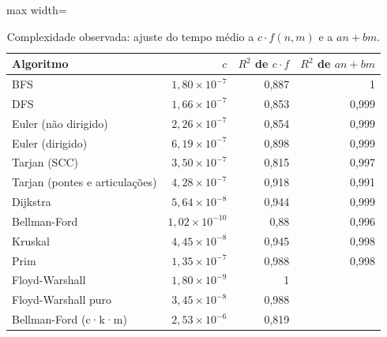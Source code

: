 \begin{table}[t]
\centering
\small
\caption{Complexidade observada: ajuste do tempo médio a $c \cdot f(n,m)$ e a $a n + b m$.}
\label{tab:ajuste}
\begin{adjustbox}{max width=\linewidth}
\begin{tabular}{lrrr}
\toprule
Algoritmo & $c$ & $R^2$ de $c\cdot f$ & $R^2$ de $an+bm$ \\
\midrule
BFS & $1,80 \times 10^{-7}$ & 0,887 & 1 \\
DFS & $1,66 \times 10^{-7}$ & 0,853 & 0,999 \\
Euler (não dirigido) & $2,26 \times 10^{-7}$ & 0,854 & 0,999 \\
Euler (dirigido) & $6,19 \times 10^{-7}$ & 0,898 & 0,999 \\
Tarjan (SCC) & $3,50 \times 10^{-7}$ & 0,815 & 0,997 \\
Tarjan (pontes e articulações) & $4,28 \times 10^{-7}$ & 0,918 & 0,991 \\
Dijkstra & $5,64 \times 10^{-8}$ & 0,944 & 0,999 \\
Bellman-Ford & $1,02 \times 10^{-10}$ & 0,88 & 0,996 \\
Kruskal & $4,45 \times 10^{-8}$ & 0,945 & 0,998 \\
Prim & $1,35 \times 10^{-7}$ & 0,988 & 0,998 \\
Floyd-Warshall & $1,80 \times 10^{-9}$ & 1 &  \\
Floyd-Warshall puro & $3,45 \times 10^{-8}$ & 0,988 &  \\
Bellman-Ford (c·k·m) & $2,53 \times 10^{-6}$ & 0,819 &  \\
\bottomrule
\end{tabular}
\end{adjustbox}
\end{table}
